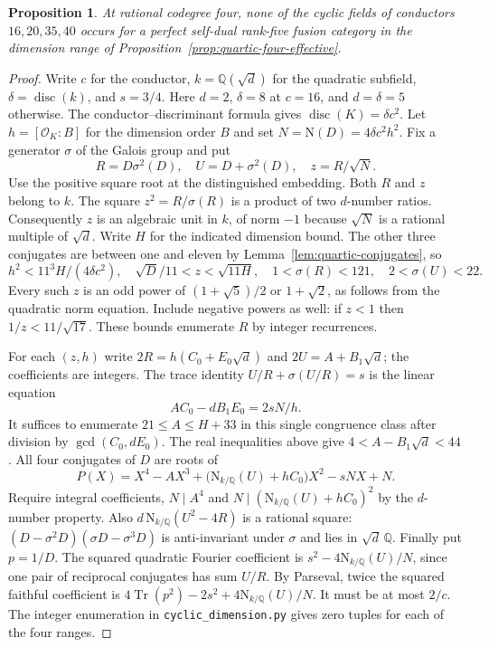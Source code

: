 \documentclass[11pt,a4paper]{article}
\newtheorem{proposition}[theorem]{Proposition}
\numberwithin{equation}{section}
\begin{document}
\begin{proposition}\label{prop:cyclic-bounded-dim}
At rational codegree four, none of the cyclic fields of conductors
$16,20,35,40$ occurs for a perfect self-dual rank-five fusion category
in the dimension range of Proposition~\ref{prop:quartic-four-effective}.
\end{proposition}
\begin{proof}
Write $c$ for the conductor, $k=\mathbb Q(\sqrt d)$ for the quadratic subfield,
$\delta=\operatorname{disc}(k)$, and $s=3/4$. Here $d=2$, $\delta=8$
at $c=16$, and $d=\delta=5$ otherwise. The conductor--discriminant formula
gives $\operatorname{disc}(K)=\delta c^2$. Let $h=[\mathcal O_K:B]$ for
the dimension order $B$ and set $N=\mathrm N(D)=4\delta c^2 h^2$.
Fix a generator $\sigma$ of the Galois group and put
\[
 R=D\sigma^2(D),\quad U=D+\sigma^2(D),\quad z=R/\sqrt N .
\]
Use the positive square root at the distinguished embedding. Both $R$ and $z$
belong to $k$. The square $z^2=R/\sigma(R)$ is a product of two
$d$-number ratios. Consequently $z$ is an algebraic unit in $k$,
of norm $-1$ because $\sqrt N$ is a rational multiple of $\sqrt d$.
Write $H$ for the indicated dimension bound. The other three conjugates
are between one and eleven by Lemma~\ref{lem:quartic-conjugates}, so
\[
 h^2<11^3 H/(4\delta c^2),\quad \sqrt D/11<z<\sqrt{11H},\quad
 1<\sigma(R)<121,\quad 2<\sigma(U)<22 .
\]
Every such $z$ is an odd power of $(1+\sqrt5)/2$ or $1+\sqrt2$, as follows from the quadratic norm equation. Include negative powers as well: if $z<1$ then $1/z<11/\sqrt{17}$. These bounds enumerate $R$ by integer recurrences.

For each $(z,h)$ write $2R=h(C_0+E_0\sqrt d)$ and $2U=A+B_1\sqrt d$;
the coefficients are integers. The trace identity $U/R+\sigma(U/R)=s$
is the linear equation
\[
        A C_0-d B_1 E_0=2sN/h.
\]
It suffices to enumerate $21\le A\le H+33$ in this single congruence
class after division by $\gcd(C_0,dE_0)$. The real inequalities above
give $4<A-B_1\sqrt d<44$. All four conjugates of $D$ are roots of
\[
 P(X)=X^4-A X^3+\bigl(\mathrm N_{k/\mathbb Q}(U)+h C_0\bigr)X^2-sN X+N.
\]
Require integral coefficients, $N\mid A^4$ and
$N\mid(\mathrm N_{k/\mathbb Q}(U)+h C_0)^2$ by the $d$-number property.
Also $d\,\mathrm N_{k/\mathbb Q}(U^2-4R)$ is a rational square:
$(D-\sigma^2 D)(\sigma D-\sigma^3D)$ is anti-invariant under $\sigma$
and lies in $\sqrt d\,\mathbb Q$. Finally put $p=1/D$. The squared quadratic Fourier coefficient is
$s^2-4\mathrm N_{k/\mathbb Q}(U)/N$, since one pair of reciprocal
conjugates has sum $U/R$. By Parseval, twice the squared faithful
coefficient is $4\operatorname{Tr}(p^2)-2s^2+4\mathrm N_{k/\mathbb Q}(U)/N$.
It must be at most $2/c$. The integer enumeration in
\texttt{cyclic\_dimension.py} gives zero tuples for each of the four ranges.
\end{proof}
\end{document}
